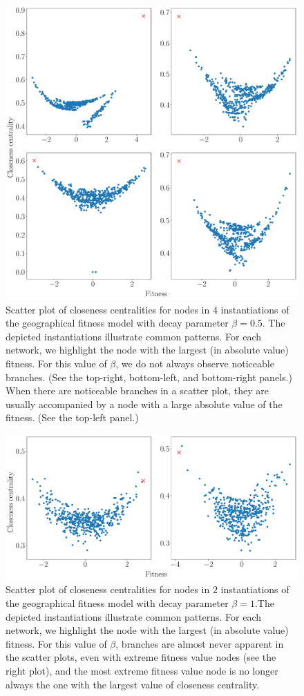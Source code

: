 \documentclass[%
 reprint,
 amsmath,amssymb,
 aps,
]{revtex4-1}
\begin{document}
\begin{figure}
    \centering
    \includegraphics[width=0.8\linewidth]{geographic_beta_05_examples_largerfont.pdf}
    \caption{Scatter plot of closeness centralities for nodes in $4$ instantiations of the geographical fitness model with decay parameter $\beta = 0.5$. The depicted instantiations illustrate common patterns. For each network, we highlight the node with the largest (in absolute value) fitness. For this value of $\beta$, we do not always observe noticeable branches. (See the top-right, bottom-left, and bottom-right panels.) When there are noticeable branches in a scatter plot, they are usually accompanied by a node with a large absolute value of the fitness. (See the top-left panel.)
    }
    \label{fig:closeness_example_2}
\end{figure}


\begin{figure}
    \centering
    \includegraphics[width=0.8\linewidth]{geographic_beta_10_examples_largerfont.pdf}
    \caption{Scatter plot of closeness centralities for nodes in $2$ instantiations of the geographical fitness model with decay parameter $\beta = 1$.The depicted instantiations illustrate common patterns. For each network, we highlight the node with the largest (in absolute value) fitness. For this value of $\beta$, branches are almost never apparent in the scatter plots, even with extreme fitness value nodes (see the right plot), and the most extreme fitness value node is no longer always the one with the largest value of closeness centrality.
    }
    \label{fig:closeness_example_3}
\end{figure}
\end{document}
